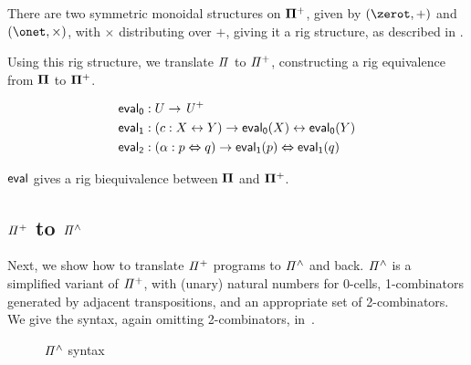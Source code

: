 \begin{proposition}
  There are two symmetric monoidal structures on $\mathbf{\Pi^{+}}$, given by $(\zerot, +)$ and $(\onet, \times)$, with
  $\times$ distributing over $+$, giving it a rig structure, as described in .
\end{proposition}

Using this rig structure, we translate $\mathit{\Pi}$ to $\mathit{{\Pi}^{+}}$, constructing a rig equivalence from $\mathbf{\Pi}$ to
$\mathbf{\Pi^{+}}$.

\begin{definition}
  \begin{align*}
    \evalt_{0} & : U \to \UPlus                                             \\
    \evalt_{1} & : (c : X \iso Y) \to \evalt_{0}(X) \iso \evalt_{0}(Y)      \\
    \evalt_{2} & : (\alpha : p \Iso q) \to \evalt_{1}(p) \Iso \evalt_{1}(q)
  \end{align*}
\end{definition}

\begin{proposition}
  $\evalt$ gives a rig biequivalence between $\mathbf{\Pi}$ and $\mathbf{\Pi^{+}}$.
\end{proposition}

\subsection{$\mathit{{\Pi}^{+}}$ to $\mathit{{\Pi}^{\wedge}}$}

Next, we show how to translate $\mathit{{\Pi}^{+}}$ programs to $\mathit{{\Pi}^{\wedge}}$ and back. $\mathit{{\Pi}^{\wedge}}$ is a simplified variant of
$\mathit{{\Pi}^{+}}$, with (unary) natural numbers for 0-cells, 1-combinators generated by adjacent transpositions, and an
appropriate set of 2-combinators. We give the syntax, again omitting 2-combinators, in~.

\begin{figure}[t]
  {}

  {}
  \caption{$\mathit{{\Pi}^{\wedge}}$ syntax}
  \label{fig:pihat}
\end{figure}

